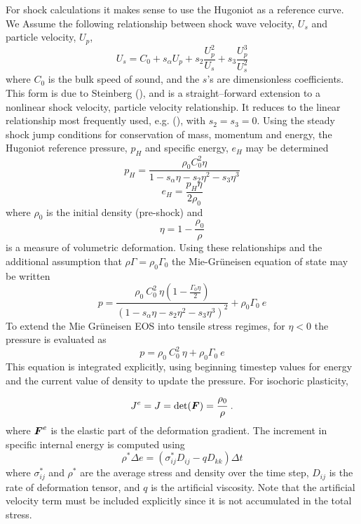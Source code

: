 For shock calculations it makes sense to use the Hugoniot as a reference curve.  We Assume the following
relationship between shock wave velocity, $U_s$ and particle velocity,  $U_p$,
\begin{equation} \label{eq:SteinbergUsUp}
  U_s = C_0 + s_\alpha U_p + s_2 \frac{U_p^2}{U_s} + s_3 \frac{U_p^3}{U_s^2}
\end{equation}
where $C_0$ is the bulk speed of sound, and the $s$'s are dimensionless coefficients.
This form is due to Steinberg (\cite{Steinberg91}), and is a straight--forward extension to a nonlinear 
shock velocity, particle velocity relationship.  It reduces to the linear relationship most frequently 
used, e.g. (\cite{Wilkins99,Zocher00}), with $s_2 = s_3 = 0$.  Using the steady shock jump conditions for
conservation of mass, momentum and energy, the Hugoniot reference pressure, $p_H$ and specific energy,
$e_H$ may be determined
\begin{equation} \label{eq:pH}
  p_H = \frac{\rho_0 C_0^2 \eta}{1 - s_\alpha \eta - s_2 \eta^2 - s_3 \eta^3}
\end{equation}
\begin{equation} \label{eq:eH}
  e_H = \frac{p_H \eta}{2 \rho_0}
\end{equation}
where $\rho_0$ is the initial density (pre-shock) and
\begin{equation} \label{eq:eta}
  \eta = 1-\frac{\rho_0}{\rho}
\end{equation}
is a measure of volumetric deformation.  Using these relationships and the additional assumption that
$\rho\Gamma=\rho_0\Gamma_0$ the Mie-Gr{\"u}neisen equation of state may be written
\begin{equation} \label{eq:EOSMG_upd}
  \boxed{
  p =  \frac{\rho_0~C_0^2~\eta(1-\frac{\Gamma_0\eta}{2})}{(1 - s_\alpha \eta - s_2 \eta^2 - s_3 \eta^3)^2}
           + \rho_0\Gamma_0~e
  }
\end{equation}
To extend the Mie Gr{\"u}neisen EOS into tensile stress regimes, for $\eta<0$ the pressure is evaluated as
\begin{equation} \label{eq:EOSMG_upd}
  \boxed{
  p =  \rho_0~C_0^2~\eta + \rho_0\Gamma_0~e
  }
\end{equation}
This equation is integrated explicitly, using beginning timestep values for energy and the current value
of density to update the pressure.  For isochoric plasticity,
\begin{equation*}
  J^e = J = \det(\BF) = \cfrac{\rho_0}{\rho} ~.
\end{equation*}
where $\BF^e$ is the elastic part of the deformation gradient.  
The increment in specific internal energy is computed using
  \begin{equation}
    \rho^* \Delta e = (\sigma^*_{ij} D_{ij} - q D_{kk}) \Delta t
  \end{equation}
where $\sigma^*_{ij}$ and $\rho^*$ are the average stress and density over the time step, 
$D_{ij}$ is the rate of deformation tensor, and $q$ is
the artificial viscosity.  Note that the artificial velocity term must be included explicitly
since it is not accumulated in the total stress.

